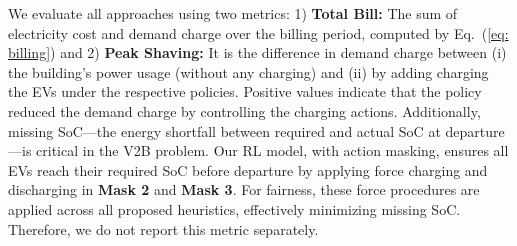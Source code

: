 %   
%  
% 

%  
 
% 

% 
% 
\noindent We evaluate all approaches using two metrics:  1) \textbf{Total Bill:} The sum of electricity cost and demand charge over the billing period, computed by Eq.~(\ref{eq: billing}) and  2) \textbf{Peak Shaving:} It is the difference in demand charge between (i) the building's power usage (without any charging) and (ii) by adding charging the EVs under the respective policies. Positive values indicate that the policy reduced the demand charge by controlling the charging actions. 
Additionally, missing SoC—the energy shortfall between required and actual SoC at departure—is critical in the V2B problem. Our RL model, with action masking, ensures all EVs reach their required SoC before departure by applying force charging and discharging in \textbf{Mask 2} and \textbf{Mask 3}. For fairness, these force procedures are applied across all proposed heuristics, effectively minimizing missing SoC. Therefore, we do not report this metric separately.


